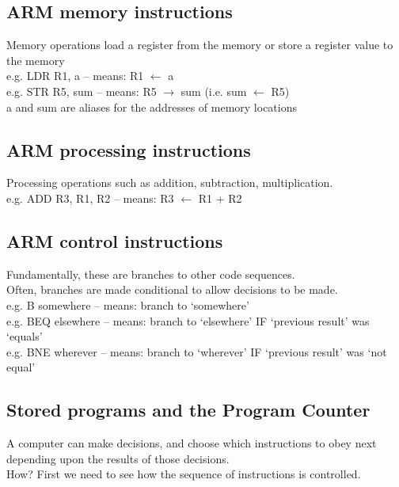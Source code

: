 \documentclass{article}
\begin{document}
\subsection{ARM memory instructions}
Memory operations load a register from the memory or store a register value to the memory\\
e.g. LDR R1, a – means: R1 \(\leftarrow\) a\\
e.g. STR R5, sum – means: R5 \(\rightarrow\) sum (i.e. sum \(\leftarrow\) R5)\\
a and sum are aliases for the addresses of memory locations
\subsection{ARM processing instructions}
Processing operations such as addition, subtraction, multiplication.\\
e.g. ADD R3, R1, R2 – means: R3 \(\leftarrow\) R1 + R2
\subsection{ARM control instructions}
Fundamentally, these are branches to other code sequences.\\
Often, branches are made conditional to allow decisions to be made.\\
e.g. B somewhere – means: branch to ‘somewhere’\\
e.g. BEQ elsewhere – means: branch to ‘elsewhere’ IF ‘previous result’ was ‘equals’\\
e.g. BNE wherever – means: branch to ‘wherever’ IF ‘previous result’ was ‘not equal’\\
\subsection{Stored programs and the Program Counter}
A computer can make decisions, and choose which instructions to obey next depending upon the results of those decisions.\\
How? First we need to see how the sequence of instructions is controlled.
\end{document}
